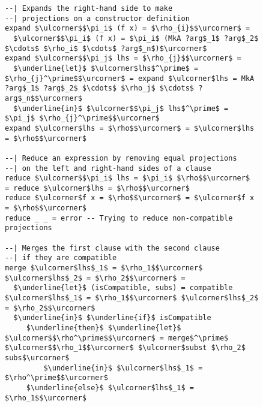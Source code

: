 \begin{figure}
\begin{lstlisting}[mathescape]
--| Expands the right-hand side to make 
--| projections on a constructor definition
expand $\ulcorner$$\pi_i$ (f x) = $\rho_{i}$$\urcorner$ = 
  $\ulcorner$$\pi_i$ (f x) = $\pi_i$ (MkA ?arg$_1$ ?arg$_2$ $\cdots$ $\rho_i$ $\cdots$ ?arg$_n$)$\urcorner$
expand $\ulcorner$$\pi_j$ lhs = $\rho_{j}$$\urcorner$ = 
  $\underline{let}$ $\ulcorner$lhs$^\prime$ = $\rho_{j}^\prime$$\urcorner$ = expand $\ulcorner$lhs = MkA ?arg$_1$ ?arg$_2$ $\cdots$ $\rho_j$ $\cdots$ ?arg$_n$$\urcorner$
  $\underline{in}$ $\ulcorner$$\pi_j$ lhs$^\prime$ = $\pi_j$ $\rho_{j}^\prime$$\urcorner$
expand $\ulcorner$lhs = $\rho$$\urcorner$ = $\ulcorner$lhs = $\rho$$\urcorner$

--| Reduce an expression by removing equal projections 
--| on the left and right-hand sides of a clause
reduce $\ulcorner$$\pi_i$ lhs = $\pi_i$ $\rho$$\urcorner$  = reduce $\ulcorner$lhs = $\rho$$\urcorner$
reduce $\ulcorner$f x = $\rho$$\urcorner$ = $\ulcorner$f x = $\rho$$\urcorner$
reduce _ _ = error -- Trying to reduce non-compatible projections

--| Merges the first clause with the second clause
--| if they are compatible
merge $\ulcorner$lhs$_1$ = $\rho_1$$\urcorner$ $\ulcorner$lhs$_2$ = $\rho_2$$\urcorner$ =
  $\underline{let}$ (isCompatible, subs) = compatible $\ulcorner$lhs$_1$ = $\rho_1$$\urcorner$ $\ulcorner$lhs$_2$ = $\rho_2$$\urcorner$
  $\underline{in}$ $\underline{if}$ isCompatible
     $\underline{then}$ $\underline{let}$ $\ulcorner$$\rho^\prime$$\urcorner$ = merge$^\prime$ $\ulcorner$$\rho_1$$\urcorner$ $\ulcorner$subst $\rho_2$ subs$\urcorner$
         $\underline{in}$ $\ulcorner$lhs$_1$ = $\rho^\prime$$\urcorner$
     $\underline{else}$ $\ulcorner$lhs$_1$ = $\rho_1$$\urcorner$


\end{lstlisting}
\end{figure}
